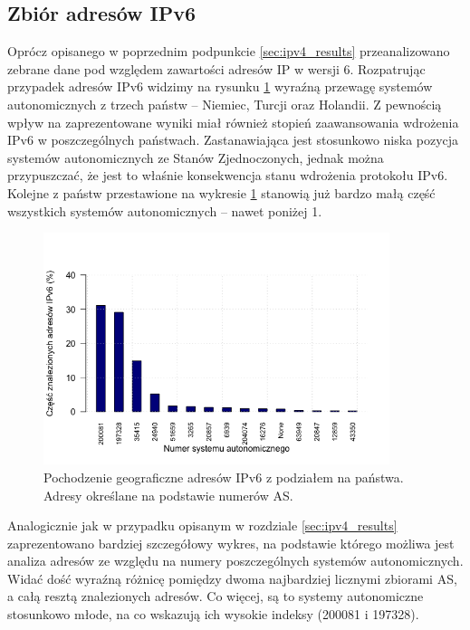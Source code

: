 \subsection{Zbiór adresów IPv6}
\noindent Oprócz opisanego w poprzednim podpunkcie \ref{sec:ipv4_results} przeanalizowano zebrane dane pod względem zawartości adresów IP
w wersji 6. Rozpatrując przypadek adresów IPv6 widzimy na rysunku \ref{fig:ipv6_as_countries} wyraźną przewagę systemów autonomicznych
z trzech państw -- Niemiec, Turcji oraz Holandii. Z pewnością wpływ na zaprezentowane wyniki miał również stopień zaawansowania
wdrożenia IPv6 w poszczególnych państwach. Zastanawiająca jest stosunkowo niska pozycja systemów autonomicznych ze Stanów Zjednoczonych,
jednak można przypuszczać, że jest to właśnie konsekwencja stanu wdrożenia protokołu IPv6. Kolejne z państw przestawione na
wykresie \ref{fig:ipv6_as_countries} stanowią już bardzo małą część wszystkich systemów autonomicznych -- nawet poniżej 1\textperthousand.
\begin{figure}[h!]
	\centering
	\includegraphics[width=0.9\textwidth]{image/ipv6_countries_no_title}
	\caption{Pochodzenie geograficzne adresów IPv6 z podziałem na państwa. Adresy określane na podstawie numerów AS.}
	\label{fig:ipv6_as_countries}
\end{figure}

Analogicznie jak w przypadku opisanym w rozdziale \ref{sec:ipv4_results} zaprezentowano bardziej szczegółowy wykres, na podstawie
którego możliwa jest analiza adresów ze względu na numery poszczególnych systemów autonomicznych. Widać dość wyraźną różnicę pomiędzy
dwoma najbardziej licznymi zbiorami AS, a całą resztą znalezionych adresów. Co więcej, są to systemy autonomiczne stosunkowo młode,
na co wskazują ich wysokie indeksy (200081 i 197328).

